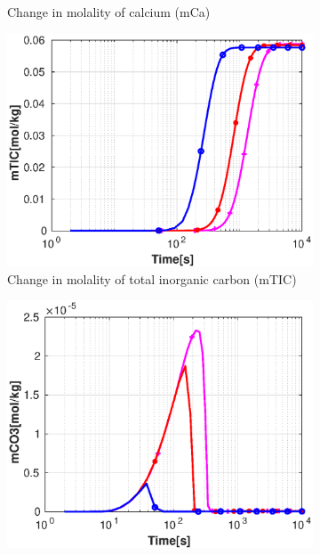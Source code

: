 \begin{figure}[!h]
\begin{subfigure}{.5\linewidth}
        \caption{\small Change in molality of calcium (mCa)}
        \label{fig:velmCa}       %
    \end{subfigure}%
        \hfill
    \begin{subfigure}{.5\linewidth}
        \centering
        \includegraphics[width=\textwidth]{PICTURES/with_vel_mTIC.eps}
        \caption{\small Change in molality of total inorganic carbon (mTIC)}
        \label{fig:velmTIC}
    \end{subfigure}%
    \hfill
    \begin{subfigure}{.5\linewidth}
        \centering
        \includegraphics[width=\textwidth]{PICTURES/with_vel_mCO3.eps}

\end{subfigure}
\end{figure}
